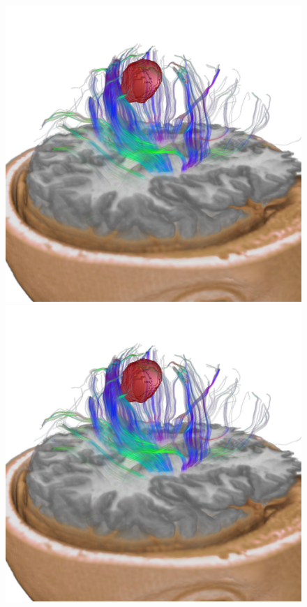\documentclass{egpubl}
\begin{document}
\begin{figure}[p]
  \centering
  \begin{minipage}[b]{0.36\linewidth}\centering
    \includegraphics[width=0.98\linewidth]{snapshots/dti/cgf/screenshot_Neuro.jpg}%
  \end{minipage}\hfill
  \begin{minipage}[b]{0.36\linewidth}\centering
    \includegraphics[trim={12cm 15cm 12cm 9cm}, clip, width=0.98\linewidth]{snapshots/dti/cgf/screenshot_Neuro.jpg}%

\end{minipage}
\end{figure}
\end{document}
